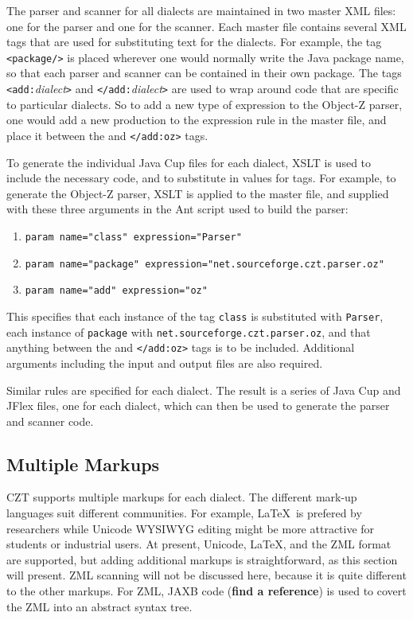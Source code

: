 \documentclass{llncs}
\begin{document}
The parser and scanner for all dialects are maintained in two master
XML files: one for the parser and one for the scanner. Each master
file contains several XML tags that are used for substituting text for
the dialects. For example, the tag {\tt <package/>} is placed wherever
one would normally write the Java package name, so that each parser
and scanner can be contained in their own package. The tags {\tt
<add:}{\em dialect}{\tt >} and {\tt </add:}{\em dialect}{\tt >} are
used to wrap around code that are specific to particular dialects. So
to add a new type of expression to the Object-Z parser, one would add
a new production to the expression rule in the master file, and place
it between the {\tt <add:oz>} and {\tt </add:oz>} tags.

To generate the individual Java Cup files for each dialect, XSLT is
used to include the necessary code, and to substitute in values for
tags. For example, to generate the Object-Z parser, XSLT is applied to
the master file, and supplied with these three arguments in the Ant
script used to build the parser:
\begin{enumerate}
  \item {\tt param name="class" expression="Parser"}
  \item {\tt param name="package" expression="net.sourceforge.czt.parser.oz"}
  \item {\tt param name="add" expression="{oz}"}
\end{enumerate}

This specifies that each instance of the tag {\tt class} is
substituted with {\tt Parser}, each instance of {\tt package} with
{\tt net.sourceforge.czt.parser.oz}, and that anything between the
{\tt <add:oz>} and {\tt </add:oz>} tags is to be included. Additional
arguments including the input and output files are also required.

Similar rules are specified for each dialect. The result is a series
of Java Cup and JFlex files, one for each dialect, which can then be
used to generate the parser and scanner code.

\subsection{Multiple Markups}

 CZT supports multiple markups for each dialect.  The different
 mark-up languages suit different communities.  For example, \LaTeX\
 is prefered by researchers while Unicode WYSIWYG editing might be
 more attractive for students or industrial users. At present,
 Unicode, \LaTeX, and the ZML format \cite{UttEA:03} are supported,
 but adding additional markups is straightforward, as this section
 will present.  ZML scanning will not be discussed here, because it is
 quite different to the other markups. For ZML, JAXB code ({\bf find a
 reference}) is used to covert the ZML into an abstract syntax tree.
\end{document}
